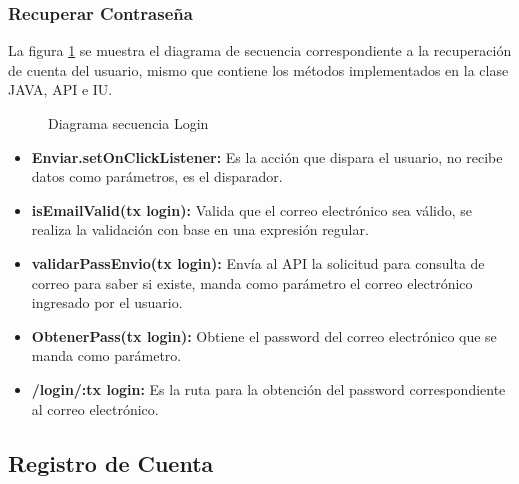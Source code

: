 \subsubsection{Recuperar Contraseña}

La figura \ref{fig:SecuenciaRecupera} se muestra el diagrama de secuencia correspondiente a la recuperación de cuenta del usuario, mismo que contiene los métodos implementados en la clase JAVA, API e IU.

\begin{figure}[htbp!]
	\centering
	\caption{Diagrama secuencia Login}
	\label{fig:SecuenciaRecupera}
\end{figure}

\begin{itemize}
	\item \textbf{Enviar.setOnClickListener:} Es la acción que dispara el usuario, no recibe datos como parámetros, es el disparador.
	\item \textbf{isEmailValid(tx login):}  Valida que el correo electrónico sea válido, se realiza la validación con base en una expresión regular.
	\item \textbf{validarPassEnvio(tx login):} Envía al API la solicitud para consulta de correo para saber si existe, manda como parámetro el correo electrónico ingresado por el usuario.
	\item \textbf{ObtenerPass(tx login):} Obtiene el password del correo electrónico que se manda como parámetro.
	\item \textbf{/login/:tx login:} Es la ruta para la obtención del password correspondiente al correo electrónico. 
\end{itemize}



\subsection{Registro de Cuenta}
